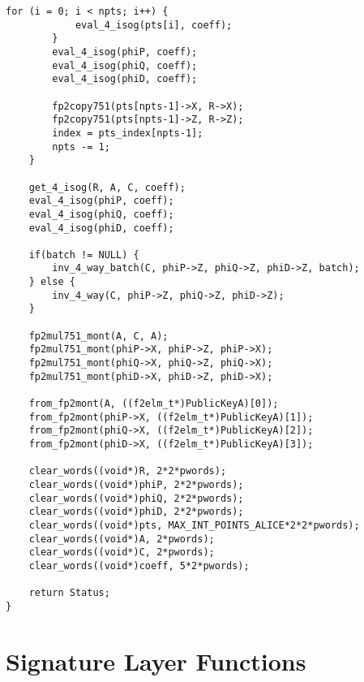\begin{lstlisting}[basicstyle=\footnotesize,]
		for (i = 0; i < npts; i++) {
			eval_4_isog(pts[i], coeff);
		}
		eval_4_isog(phiP, coeff);
		eval_4_isog(phiQ, coeff);
		eval_4_isog(phiD, coeff);

		fp2copy751(pts[npts-1]->X, R->X); 
		fp2copy751(pts[npts-1]->Z, R->Z);
		index = pts_index[npts-1];
		npts -= 1;
	}

	get_4_isog(R, A, C, coeff); 
	eval_4_isog(phiP, coeff);
	eval_4_isog(phiQ, coeff);
	eval_4_isog(phiD, coeff);

	if(batch != NULL) {
		inv_4_way_batch(C, phiP->Z, phiQ->Z, phiD->Z, batch);
	} else {
		inv_4_way(C, phiP->Z, phiQ->Z, phiD->Z);
	}
	
	fp2mul751_mont(A, C, A);
	fp2mul751_mont(phiP->X, phiP->Z, phiP->X);
	fp2mul751_mont(phiQ->X, phiQ->Z, phiQ->X);
	fp2mul751_mont(phiD->X, phiD->Z, phiD->X);

	from_fp2mont(A, ((f2elm_t*)PublicKeyA)[0]);
	from_fp2mont(phiP->X, ((f2elm_t*)PublicKeyA)[1]);
	from_fp2mont(phiQ->X, ((f2elm_t*)PublicKeyA)[2]);
	from_fp2mont(phiD->X, ((f2elm_t*)PublicKeyA)[3]);

	clear_words((void*)R, 2*2*pwords);
	clear_words((void*)phiP, 2*2*pwords);
	clear_words((void*)phiQ, 2*2*pwords);
	clear_words((void*)phiD, 2*2*pwords);
	clear_words((void*)pts, MAX_INT_POINTS_ALICE*2*2*pwords);
	clear_words((void*)A, 2*pwords);
	clear_words((void*)C, 2*pwords);
	clear_words((void*)coeff, 5*2*pwords);
      
	return Status;
}
\end{lstlisting}

\section{Signature Layer Functions}
